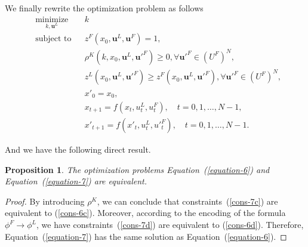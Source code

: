 \documentclass[letterpaper, 10 pt, conference]{ieeeconf}
\newtheorem{proposition}{\bf Proposition}
\begin{document}
We finally rewrite the optimization problem as follows
\begin{subequations}\label{equation-7}
\begin{align}
& \underset{k,\mathbf{u}^L}{\text{minimize}} & & k \\
& \text{subject to} & & z^F(x_0,\mathbf{u}^L,\mathbf{u}^F)=1, \label{cons-7b} \\
& & & \rho^K(k,x_0,\mathbf{u}^L,\mathbf{u}'^F)\geq0,\forall \mathbf{u}'^F\! \in\! (U^F)^N, \label{cons-7c} \\
& & & \!\!\!\!\!\!\!\!\!\!\!\!\!\!\!\!\!\!\!\!\!\!\!\!\!\!\!\!
z^L(x_0,\mathbf{u}^L,\mathbf{u}'^F)\geq z^F(x_0,\mathbf{u}^L,\mathbf{u}'^F),\forall\mathbf{u}'^F \!\in\! (U^F)^N, \label{cons-7d} \\
& & & x'_0=x_0, \nonumber \\
& & & x_{t+1} = f(x_t, u^L_t, u^F_t), \quad t = 0, 1, \dots, N-1, \nonumber \\
& & & x'_{t+1} = f(x'_t, u^L_t, u'^F_t), \quad t = 0, 1, \dots, N-1. \nonumber
\end{align}    
\end{subequations}

And we have the following direct result.
\begin{proposition}
The optimization problems Equation~(\ref{equation-6}) and Equation~(\ref{equation-7}) are equivalent.
\end{proposition}
\begin{proof}
    By introducing $\rho^K$, we can conclude that constraints~(\ref{cons-7c}) are equivalent to (\ref{cons-6c}). Moreover, according to the encoding of the formula $\phi^F\to \phi^L$, we have constraints~(\ref{cons-7d}) are equivalent to (\ref{cons-6d}).
    Therefore, Equation~(\ref{equation-7}) has the same solution as Equation~(\ref{equation-6}).
\end{proof}
\end{document}
